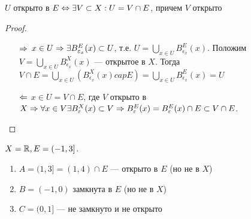 \begin{lemma}
    \(U\) открыто в \(E \Leftrightarrow \exists V \subset X: U = V \cap E\), причем \(V\) открыто
\end{lemma}
\begin{proof}\indent
    \begin{enumerate}
        \item[\(\Rightarrow\)] \(x \in U \Rightarrow \exists B_{\varepsilon_x}^E(x) \subset U\), т.е. \(U = \bigcup_{x \in U}B_{\epsilon_x}^E(x)\). Положим \(V = \bigcup_{x \in U}B_{\epsilon_x}^X(x)\) --- открытое в \(X\). Тогда \(V \cap E = \bigcup_{x \in U}(B_{\epsilon_x}^X(x) cap E) = \bigcup_{x \in U}B_{\epsilon_x}^E(x) = U\)
        \item[\(\Leftarrow\)] \(x \in U = V \cap E\), где \(V\) открыто в \(X \Rightarrow \forall x \in V \exists B_{\varepsilon}^X(x) \subset V \Rightarrow B_{\varepsilon}^E(x) = B_{\varepsilon}^E(x) \cap E \subset V \cap E\).
    \end{enumerate}    
\end{proof}

\begin{example}
    \(X = \mathbb{R}, E = (-1, 3]\).
    \begin{enumerate}
        \item \(A = (1, 3] = (1, 4) \cap E\) --- открыто в \(E\) (но не в \(X\))
        \item \(B = (-1, 0)\) замкнута в \(E\) (но не в \(X\))
        \item \(C = (0, 1]\) --- не замкнуто и не открыто
    \end{enumerate}
\end{example}